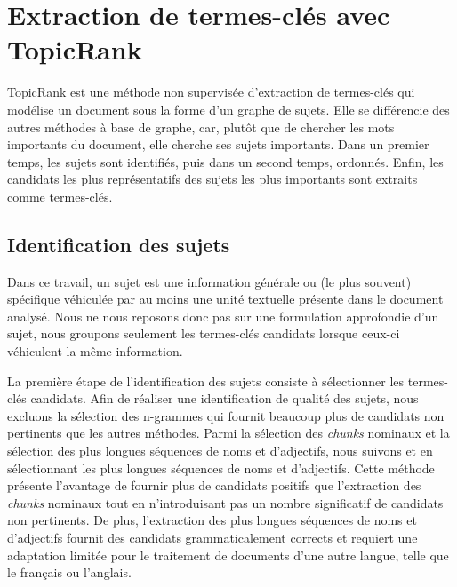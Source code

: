 \section{Extraction de termes-clés avec TopicRank}
\label{sec:extraction_de_termes_cles_avec_topicrank}
  TopicRank est une méthode non supervisée d'extraction de termes-clés qui
  modélise un document sous la forme d'un graphe de sujets.
  Elle se différencie des autres méthodes à base de graphe, car, plutôt que de
  chercher les mots importants du document, elle cherche ses sujets importants.
  Dans un premier temps, les sujets sont identifiés, puis dans un second temps,
  ordonnés. Enfin, les candidats les plus représentatifs des sujets les plus
  importants sont extraits comme termes-clés.

  \subsection{Identification des sujets}
  \label{subsec:identification_des_sujets}
    Dans ce travail, un sujet est une information générale ou (le plus souvent)
    spécifique véhiculée par au moins une unité textuelle présente dans le
    document analysé. Nous ne nous reposons donc pas sur une formulation
    approfondie d'un sujet, nous groupons seulement les termes-clés candidats
    lorsque ceux-ci véhiculent la même information.

    La première étape de l'identification des sujets consiste à sélectionner les
    termes-clés candidats.
    Afin de réaliser une identification de qualité des sujets, nous excluons la
    sélection des n-grammes qui fournit beaucoup plus de candidats non
    pertinents que les autres méthodes. Parmi la sélection des \textit{chunks} nominaux
    et la sélection des plus longues séquences de noms et d'adjectifs, nous
    suivons  et  en
    sélectionnant les plus longues séquences de noms et d'adjectifs. Cette
    méthode présente l'avantage de fournir plus de candidats positifs que
    l'extraction des \textit{chunks} nominaux tout en n'introduisant pas un nombre
    significatif de candidats non pertinents. De plus, l'extraction des plus
    longues séquences de noms et d'adjectifs fournit des candidats
    grammaticalement corrects et requiert une adaptation limitée pour le
    traitement de documents d'une autre langue, telle que le français ou
    l'anglais.

